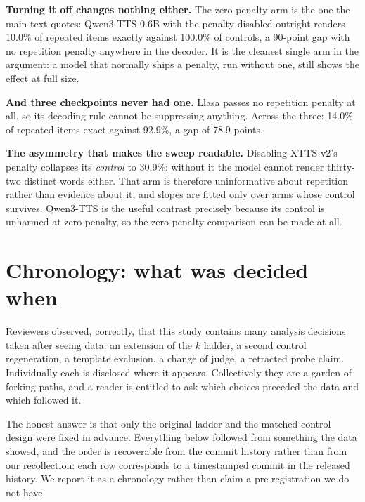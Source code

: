 \documentclass[11pt]{article}
\begin{document}
\noindent\textbf{Turning it off changes nothing either.} The zero-penalty arm
is the one the main text quotes: Qwen3-TTS-0.6B with the
penalty disabled outright renders 10.0\% of repeated items exactly against
100.0\% of controls, a 90-point gap with no repetition penalty
anywhere in the decoder. It is the cleanest single arm in the argument: a model
that normally ships a penalty, run without one, still shows the effect at full
size.

\noindent\textbf{And three checkpoints never had one.} Llasa passes no
repetition penalty at all, so its decoding rule cannot be suppressing anything.
Across the three: 14.0\% of repeated items exact against 92.9\%, a gap of
78.9 points.

\noindent\textbf{The asymmetry that makes the sweep readable.} Disabling
XTTS-v2's penalty collapses its \emph{control} to 30.9\%: without it the
model cannot render thirty-two distinct words either. That arm is therefore
uninformative about repetition rather than evidence about it, and slopes are
fitted only over arms whose control survives. Qwen3-TTS is the useful contrast
precisely because its control is unharmed at zero penalty, so the zero-penalty
comparison can be made at all.


\section{Chronology: what was decided when}
\label{sec:s16}

Reviewers observed, correctly, that this study contains many analysis decisions
taken after seeing data: an extension of the $k$ ladder, a second control
regeneration, a template exclusion, a change of judge, a retracted probe claim.
Individually each is disclosed where it appears. Collectively they are a garden
of forking paths, and a reader is entitled to ask which choices preceded the data
and which followed it.

The honest answer is that only the original ladder and the matched-control design
were fixed in advance. Everything below followed from something the data showed,
and the order is recoverable from the commit history rather than
from our recollection: each row corresponds to a timestamped commit in the
released history. We report it as a chronology rather than claim a pre-registration we
do not have.
\end{document}
